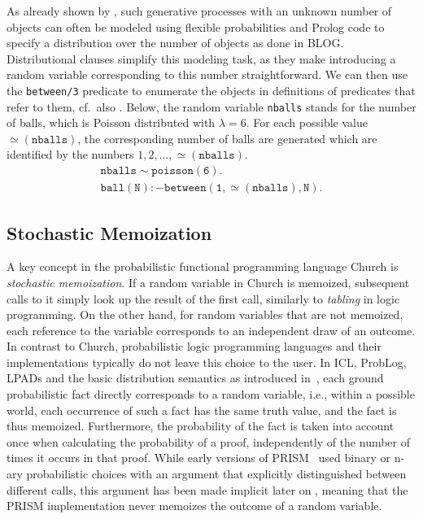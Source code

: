 \documentclass[a4paper]{article}
\newcommand{\val}{\ensuremath{\simeq\!\!}}
\begin{document}
As already shown by \cite{Poole08}, such generative processes with an unknown
number of objects can often be modeled using flexible
probabilities and Prolog code to specify a distribution over the
number of objects as done in BLOG. 
Distributional clauses simplify this modeling task, as they make introducing a random
variable corresponding to this number straightforward. We can then use the \texttt{between/3} predicate to enumerate the objects in definitions of predicates that refer to them, cf.~also \citep{Poole08}.  
Below, the random variable \texttt{nballs} stands for the number of
balls, which is Poisson distributed with $\lambda=6$. For each
possible value $\val(\mathtt{nballs})$, the corresponding number of balls are generated which are identified by the numbers $1,2,\ldots,\val(\mathtt{nballs})$. 
\begin{align*} \mathtt{ nballs \sim poisson(6).}\\
\mathtt{ball(N) :- between(1,\val(nballs),N)}.
\end{align*}







\subsection{Stochastic Memoization}
\label{sec:repeat}
A key concept in the probabilistic functional programming language
Church \citep{Goodman08} is \emph{stochastic memoization}. If a random
variable in Church is memoized, subsequent calls to it simply look up
the result of the first call, similarly to \emph{tabling} in logic
programming. On the other hand, for random variables that are not
memoized, each reference to the variable corresponds to an independent
draw of an outcome. In contrast to Church,
probabilistic logic programming languages and their implementations typically do not leave this choice
to the user. 
In ICL, ProbLog, LPADs and the basic distribution semantics as introduced in~\citep{Sato:95}, 
each ground probabilistic fact directly corresponds to a
random variable, i.e., within a possible world, each occurrence of
such a fact has the same truth value, and the fact is thus memoized. Furthermore, the probability of
the fact is taken into account once when calculating the probability
of a proof, independently of the number of times it occurs in that
proof. 
While early versions of PRISM~\citep{Sato:95,sato:ijcai97} used binary or
n-ary probabilistic choices with an argument that explicitly
distinguished between different calls, this argument has been made
implicit later on \citep{SatoKameya:01}, meaning that the PRISM
implementation never memoizes the outcome of a random variable.  
\end{document}
